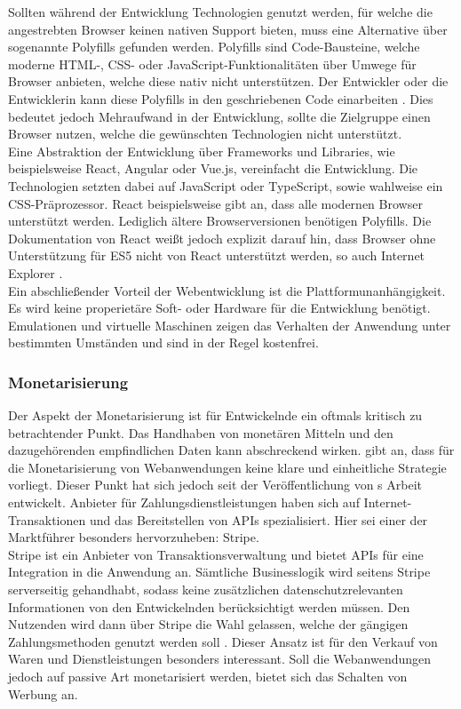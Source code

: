 \documentclass[a4paper]{scrartcl}
\begin{document}
Sollten während der Entwicklung Technologien genutzt werden, für welche die angestrebten Browser keinen nativen Support bieten, muss eine Alternative über sogenannte Polyfills gefunden werden. Polyfills sind Code-Bausteine, welche moderne HTML-, CSS- oder JavaScript-Funktionalitäten über Umwege für Browser anbieten, welche diese nativ nicht unterstützen. Der Entwickler oder die Entwicklerin kann diese Polyfills in den geschriebenen Code einarbeiten \autocite{Polyfills}. Dies bedeutet jedoch Mehraufwand in der Entwicklung, sollte die Zielgruppe einen Browser nutzen, welche die gewünschten Technologien nicht unterstützt. \\

Eine Abstraktion der Entwicklung über Frameworks und Libraries, wie beispielsweise React, Angular oder Vue.js, vereinfacht die Entwicklung. Die Technologien setzten dabei auf JavaScript oder TypeScript, sowie wahlweise ein CSS-Präprozessor. React beispielsweise gibt an, dass alle modernen Browser unterstützt werden. Lediglich ältere Browserversionen benötigen Polyfills. Die Dokumentation von React weißt jedoch explizit darauf hin, dass Browser ohne Unterstützung für ES5 nicht von React unterstützt werden, so auch Internet Explorer \autocite{ReactDOM}. \\

Ein abschließender Vorteil der Webentwicklung ist die Plattformunanhängigkeit. Es wird keine properietäre Soft- oder Hardware für die Entwicklung benötigt. Emulationen und virtuelle Maschinen zeigen das Verhalten der Anwendung unter bestimmten Umständen und sind in der Regel kostenfrei. \\

\subsubsection{Monetarisierung}
Der Aspekt der Monetarisierung ist für Entwickelnde ein oftmals kritisch zu betrachtender Punkt. Das Handhaben von monetären Mitteln und den dazugehörenden empfindlichen Daten kann abschreckend wirken. \textcite[28]{Jobe} gibt an, dass für die Monetarisierung von Webanwendungen keine klare und einheitliche Strategie vorliegt. Dieser Punkt hat sich jedoch seit der Veröffentlichung von \textcite{Jobe}s Arbeit entwickelt. Anbieter für Zahlungsdienstleistungen haben sich auf Internet-Transaktionen und das Bereitstellen von APIs spezialisiert. Hier sei einer der Marktführer besonders hervorzuheben: Stripe. \\
Stripe ist ein Anbieter von Transaktionsverwaltung und bietet APIs für eine Integration in die Anwendung an. Sämtliche Businesslogik wird seitens Stripe serverseitig gehandhabt, sodass keine zusätzlichen datenschutzrelevanten Informationen von den Entwickelnden berücksichtigt werden müssen. Den Nutzenden wird dann über Stripe die Wahl gelassen, welche der gängigen Zahlungsmethoden genutzt werden soll \autocite{Stripe}. Dieser Ansatz ist für den Verkauf von Waren und Dienstleistungen besonders interessant. Soll die Webanwendungen jedoch auf passive Art monetarisiert werden, bietet sich das Schalten von Werbung an. \\
\end{document}
